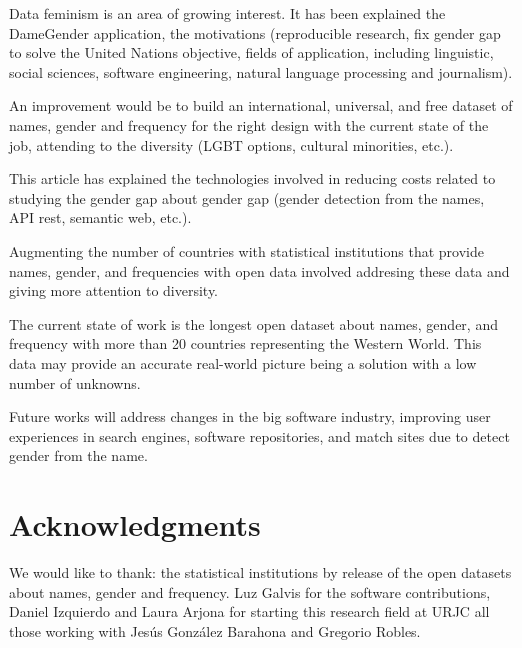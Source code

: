 \documentclass[a4paper]{article}
\begin{document}
Data feminism\cite{d2020data} is an area of growing interest.
It has been explained the DameGender application,
the motivations (reproducible research, fix gender gap to solve the
United Nations objective, fields of application, including linguistic,
social sciences, software engineering, natural language processing and
journalism).

An improvement would be to build an international, universal, and free
dataset of names, gender and frequency for the right design with
the current state of the job, attending to the diversity (LGBT
options, cultural minorities, etc.).

This article has explained the technologies involved in reducing costs
related to studying the gender gap about gender gap (gender detection
from the names, API rest, semantic web, etc.).

Augmenting the number of countries with statistical institutions
that provide names, gender, and frequencies with open data
involved addresing these data and giving more attention to
diversity.

The current state of work is the longest open dataset about names,
gender, and frequency with more than 20 countries representing the
Western World. This data may provide an accurate real-world picture
being a solution with a low number of unknowns.

Future works will address changes in the big software industry,
improving user experiences in search engines, software repositories,
and match sites due to detect gender from the name.


\section*{Acknowledgments}

We would like to thank: the statistical institutions by
release of the open datasets about names, gender and frequency.
Luz Galvis for the software contributions, Daniel Izquierdo and
Laura Arjona for starting this research field at URJC all those
working with Jesús González Barahona and Gregorio Robles. 



\end{document}
